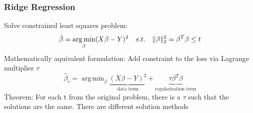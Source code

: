 \documentclass[11pt]{article}
\DeclareMathOperator*{\argmin}{arg\,min}
\DeclarePairedDelimiter\norm{\lVert}{\rVert}
\begin{document}
    \subsubsection{Ridge Regression}
    Solve constrained least squares problem:
    \begin{equation*}
      \hat{\beta}=\argmin_\beta (X\beta-Y)^2 \quad s.t. \quad \norm{\beta}_2^2=\beta^T\beta \leq t
    \end{equation*}
    Mathematically aquivalent formulation: Add constraint to the loss via Lagrange multiplier $\tau$
    \begin{equation*}
      \hat{\beta}_\tau = \argmin_\beta \underbrace{(X\beta-Y)^2}_{\text{data term}} +
      \underbrace{\tau \beta^T\beta}_{\text{regularization term}}
    \end{equation*}
    Theorem: For each t from the original problem, there is a $\tau$ such that
    the solutions are the same. There are different solution methods
\end{document}
